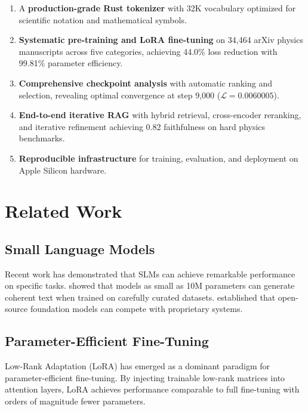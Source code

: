 \documentclass[11pt,a4paper]{article}
\theoremstyle{plain}
\theoremstyle{definition}
\newcommand{\loss}{\mathcal{L}}
\begin{document}
\begin{enumerate}[leftmargin=*,itemsep=2pt]
    \item A \textbf{production-grade Rust tokenizer} with 32K vocabulary
    optimized for scientific notation and mathematical symbols.

    \item \textbf{Systematic pre-training and LoRA fine-tuning} on
    34,464 arXiv physics manuscripts across five categories, achieving
    44.0\% loss reduction with 99.81\% parameter efficiency.

    \item \textbf{Comprehensive checkpoint analysis} with automatic
    ranking and selection, revealing optimal convergence at step 9,000
    ($\loss = 0.0060005$).

    \item \textbf{End-to-end iterative RAG} with hybrid retrieval,
    cross-encoder reranking, and iterative refinement achieving 0.82
    faithfulness on hard physics benchmarks.

    \item \textbf{Reproducible infrastructure} for training,
    evaluation, and deployment on Apple Silicon hardware.
\end{enumerate}

\section{Related Work}

\subsection{Small Language Models}

Recent work has demonstrated that SLMs can achieve remarkable
performance on specific tasks. \citet{eldan2023tinystories} showed
that models as small as 10M parameters can generate coherent text
when trained on carefully curated datasets.
\citet{touvron2023llama} established that open-source foundation
models can compete with proprietary systems.

\subsection{Parameter-Efficient Fine-Tuning}

Low-Rank Adaptation (LoRA) \citep{hu2021lora} has emerged as a
dominant paradigm for parameter-efficient fine-tuning. By injecting
trainable low-rank matrices into attention layers, LoRA achieves
performance comparable to full fine-tuning with orders of magnitude
fewer parameters.
\end{document}
